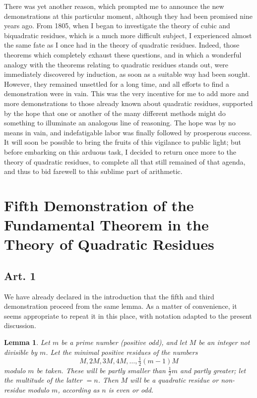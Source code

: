 \documentclass{book}
\theoremstyle{plain}
\newtheorem{lemma}{Lemma}
\theoremstyle{remark}
\begin{document}
There was yet another reason, which prompted me to announce the new demonstrations at this particular moment, although they had been promised nine years ago.  From 1805, when I began to investigate the theory of cubic and biquadratic residues, which is a much more difficult subject, I experienced almost the same fate as I once had in the theory of quadratic residues.  Indeed, those theorems which completely exhaust these questions, and in which a wonderful analogy with the theorems relating to quadratic residues stands out, were immediately discovered by induction, as soon as a suitable way had been sought. However, they remained unsettled for a long time, and all efforts to find a demonstration were in vain.  This was the very incentive for me to add more and more demonstrations to those already known about quadratic residues, supported by the hope that one or another of the many different methods might do something to illuminate an analogous line of reasoning.  The hope was by no means in vain, and indefatigable labor was finally followed by prosperous success.  It will soon be possible to bring the fruits of this vigilance to public light; but before embarking on this arduous task, I decided to return once more to the theory of quadratic residues, to complete all that still remained of that agenda, and thus to bid farewell to this sublime part of arithmetic.
\newpage
\section*{Fifth Demonstration of the Fundamental Theorem in the Theory of Quadratic Residues}

\subsection*{Art. 1} 

We have already declared in the introduction that the fifth and third demonstration proceed from the same lemma.  As a matter of convenience, it seems appropriate to repeat it in this place, with notation adapted to the present discussion.

\begin{lemma}  Let $m$ be a prime number (positive odd), and let $M$ be an integer not divisible by $m$.   Let the minimal positive residues of the numbers
\[ M, 2M, 3M, 4M,\dots, \tfrac{1}{2}(m-1)M \]
modulo $m$ be taken.  These will be partly smaller than $\tfrac{1}{2}m$ and partly greater; let the multitude of the latter $=n$.  Then $M$ will be a quadratic residue or non-residue modulo $m$, according as $n$ is even or odd. \end{lemma}
\end{document}
